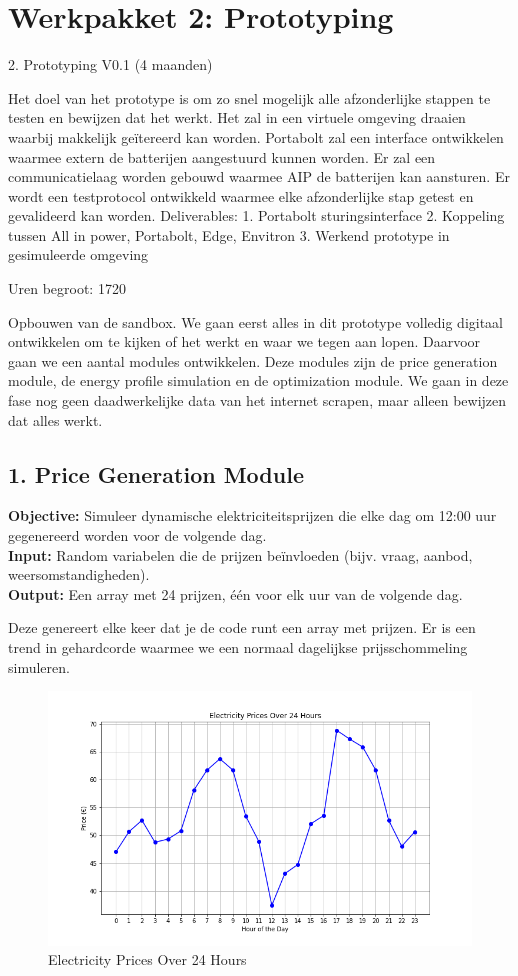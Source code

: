\section{Werkpakket 2: Prototyping}
2. Prototyping V0.1 (4 maanden) 

Het doel van het prototype is om zo snel mogelijk alle afzonderlijke stappen te testen en bewijzen dat het werkt. Het zal in een virtuele omgeving draaien waarbij makkelijk geïtereerd kan worden. Portabolt zal een interface ontwikkelen waarmee extern de batterijen aangestuurd kunnen worden. Er zal een communicatielaag worden gebouwd waarmee AIP de batterijen kan aansturen. Er wordt een testprotocol ontwikkeld waarmee elke afzonderlijke stap getest en gevalideerd kan worden. 
Deliverables: 
1. Portabolt sturingsinterface 
2. Koppeling tussen All in power, Portabolt, Edge, Envitron 
3. Werkend prototype in gesimuleerde omgeving 

Uren begroot: 1720

Opbouwen van de sandbox. We gaan eerst alles in dit prototype volledig digitaal ontwikkelen om te kijken of het werkt en waar we tegen aan lopen. Daarvoor gaan we een aantal modules ontwikkelen. Deze modules zijn de price generation module, de energy profile simulation en de optimization module. We gaan in deze fase nog geen daadwerkelijke data van het internet scrapen, maar alleen bewijzen dat alles werkt.   

\subsection{1. Price Generation Module}
\textbf{Objective:} Simuleer dynamische elektriciteitsprijzen die elke dag om 12:00 uur gegenereerd worden voor de volgende dag. \\
\textbf{Input:} Random variabelen die de prijzen beïnvloeden (bijv. vraag, aanbod, weersomstandigheden). \\
\textbf{Output:} Een array met 24 prijzen, één voor elk uur van de volgende dag.

Deze genereert elke keer dat je de code runt een array met prijzen. Er is een trend in gehardcorde waarmee we een normaal dagelijkse prijsschommeling simuleren. 

\begin{figure}[h!]
  \centering
  \includegraphics[width=\textwidth]{figures/price_generation_plot.png}
  \caption{Electricity Prices Over 24 Hours}
  \label{fig:price_plot}
\end{figure}

